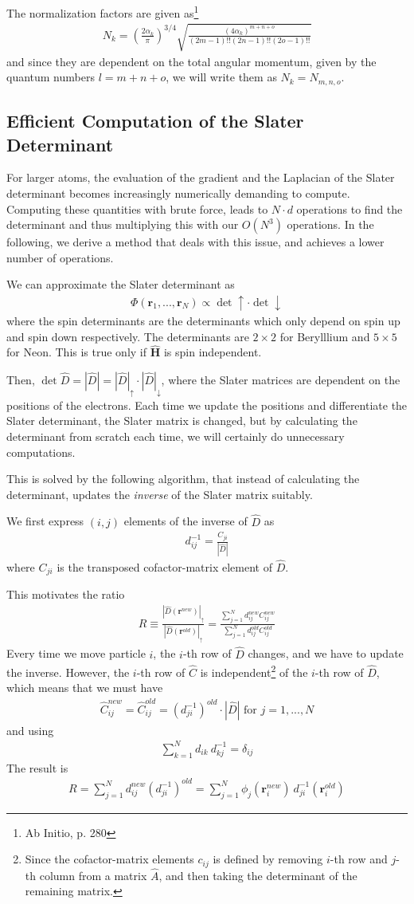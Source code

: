 \documentclass[twocolumns, a4paper,11pt,fleqn]{extarticle}
\newcommand{\eq}[1]{{\small\begin{align*}#1\end{align*}}}
\renewcommand\vec[1]{\boldsymbol{\mathbf{#1}}}
\newcommand{\OP}[1]{\mathbf{\widehat{#1}}}
\newcommand{\op}[1]{\hat{#1}}
\begin{document}
The normalization factors are given as\footnote{Ab Initio, p. 280}
\eq{
  N_k = \left(\frac{2\alpha_k}{\pi}\right)^{3/4}
  \sqrt{\frac{(4\alpha_k)^{m+n+o}}{(2m-1)!!(2n-1)!!(2o-1)!!}}
}
and since they are dependent on the total angular momentum,
given by the quantum numbers $l = m+n+o$, we will write them as
$N_k = N_{m,n,o}$.

\subsection{Efficient Computation of the Slater Determinant}

For larger atoms, the evaluation of the gradient and the Laplacian of the Slater
determinant becomes increasingly numerically demanding
to compute. Computing these quantities with brute force, 
leads to $N\cdot d$ operations to find the determinant and thus
multiplying this with our $O(N^3)$ operations.
In the following, we derive a method that deals with this issue, 
and achieves a lower number of operations.

We can approximate the Slater determinant as
\eq{
	\Phi(\vec r_1, ..., \vec r_N) \propto \det\uparrow\cdot\det\downarrow
}
where the spin determinants are the determinants which only depend on spin up and spin down
respectively. The determinants are $2\times 2$ for Berylllium and $5\times 5$ for Neon.
This is true only if $\OP H$ is spin independent.

Then, $\det \op D = |\op D| = |\op D|_{\uparrow}\cdot |\op D|_{\downarrow}$, 
where the Slater matrices are dependent on the positions of the electrons. 
Each time we update the positions and differentiate the Slater determinant,
the Slater matrix is changed, but by calculating the determinant 
from scratch each time, we will certainly do unnecessary computations. 

This is solved by the following algorithm, that instead of calculating 
the determinant, updates the \textit{inverse} of the Slater matrix suitably.

We first express $(i,j)$ elements of the inverse of $\op D$ as
\eq{
  d_{ij}^{-1} = \frac{C_{ji}}{|\op D|}
}
where $C_{ji}$ is the transposed cofactor-matrix element of $\op D$.

This motivates the ratio
\eq{
  R \equiv \frac{|\op D(\vec r^{new})|_{\uparrow}}{|\op D(\vec r^{old})|_{\uparrow}} 
  = \frac{\sum_{j=1}^N d_{ij}^{new} C_{ij}^{new}}
    {\sum_{j=1}^N d_{ij}^{old} C_{ij}^{old}}
}
Every time we move particle $i$, the $i$-th row of $\op D$ changes,
and we have to update the inverse. However, the $i$-th row of $\op C$
is independent\footnote{Since the cofactor-matrix elements $c_{ij}$ is defined by 
removing $i$-th row and $j$-th column from a matrix $\op A$,
and then taking the determinant of the remaining matrix.} 
of the $i$-th row of $\op D$, which means that
we must have
\eq{
  \op C_{ij}^{new} = \op C_{ij}^{old} = (d_{ji}^{-1})^{old}\cdot |\op D| 
    \text{ for } j=1,...,N
}
and using
\eq{
  \sum_{k=1}^N d_{ik}\ d_{kj}^{-1} =\delta_{ij}
}
The result is
\eq{
  R=\sum_{j=1}^N d_{ij}^{new} (d_{ji}^{-1})^{old}
    =\sum_{j=1}^N \phi_j(\vec r_i^{new})\ d_{ji}^{-1} (\vec r_i^{old})
}
\end{document}
